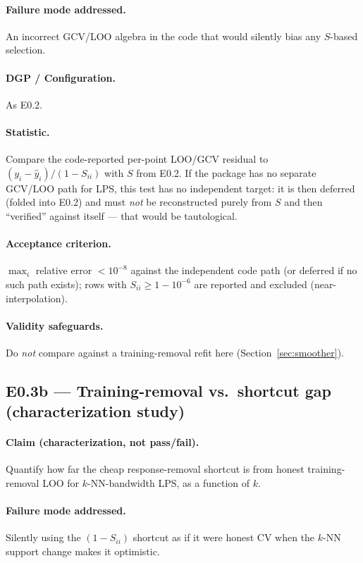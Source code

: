 \documentclass[11pt]{article}
\begin{document}
\paragraph{Failure mode addressed.} An incorrect GCV/LOO algebra in the code that would silently
bias any $S$-based selection.

\paragraph{DGP / Configuration.} As E0.2.

\paragraph{Statistic.} Compare the code-reported per-point LOO/GCV residual to
$(y_i-\hat y_i)/(1-S_{ii})$ with $S$ from E0.2. If the package has no separate GCV/LOO path for
LPS, this test has no independent target: it is then deferred (folded into E0.2) and must
\emph{not} be reconstructed purely from $S$ and then ``verified'' against itself --- that would
be tautological.

\paragraph{Acceptance criterion.} $\max_i$ relative error $<10^{-8}$ against the independent code
path (or deferred if no such path exists); rows with $S_{ii}\ge 1-10^{-6}$ are reported and
excluded (near-interpolation).

\paragraph{Validity safeguards.} Do \emph{not} compare against a training-removal refit here
(Section~\ref{sec:smoother}).

\subsection{E0.3b — Training-removal vs.\ shortcut gap (characterization study)}

\paragraph{Claim (characterization, not pass/fail).} Quantify how far the cheap response-removal
shortcut is from honest training-removal LOO for $k$-NN-bandwidth LPS, as a function of $k$.

\paragraph{Failure mode addressed.} Silently using the $(1-S_{ii})$ shortcut as if it were
honest CV when the $k$-NN support change makes it optimistic.
\end{document}
